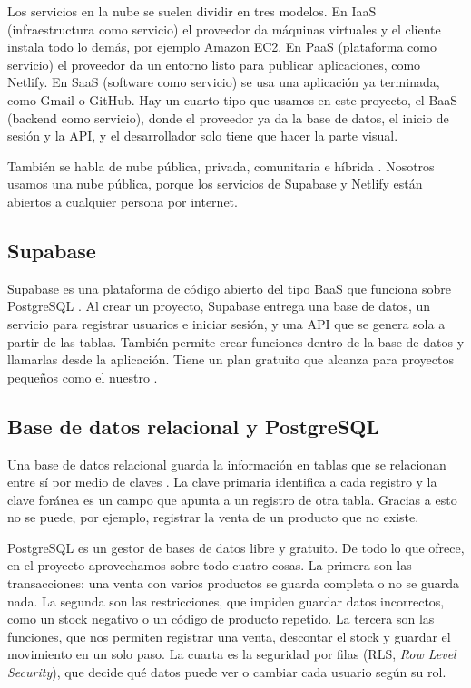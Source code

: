 \documentclass[12pt,a4paper]{article}
\begin{document}
Los servicios en la nube se suelen dividir en tres modelos. En IaaS (infraestructura como servicio) el proveedor da máquinas virtuales y el cliente instala todo lo demás, por ejemplo Amazon EC2. En PaaS (plataforma como servicio) el proveedor da un entorno listo para publicar aplicaciones, como Netlify. En SaaS (software como servicio) se usa una aplicación ya terminada, como Gmail o GitHub. Hay un cuarto tipo que usamos en este proyecto, el BaaS (backend como servicio), donde el proveedor ya da la base de datos, el inicio de sesión y la API, y el desarrollador solo tiene que hacer la parte visual.

También se habla de nube pública, privada, comunitaria e híbrida \cite{nist}. Nosotros usamos una nube pública, porque los servicios de Supabase y Netlify están abiertos a cualquier persona por internet.

\subsection{Supabase}

Supabase es una plataforma de código abierto del tipo BaaS que funciona sobre PostgreSQL \cite{supabasedocs}. Al crear un proyecto, Supabase entrega una base de datos, un servicio para registrar usuarios e iniciar sesión, y una API que se genera sola a partir de las tablas. También permite crear funciones dentro de la base de datos y llamarlas desde la aplicación. Tiene un plan gratuito que alcanza para proyectos pequeños como el nuestro \cite{supabasedocs}.

\subsection{Base de datos relacional y PostgreSQL}

Una base de datos relacional guarda la información en tablas que se relacionan entre sí por medio de claves \cite{silberschatz}. La clave primaria identifica a cada registro y la clave foránea es un campo que apunta a un registro de otra tabla. Gracias a esto no se puede, por ejemplo, registrar la venta de un producto que no existe.

PostgreSQL es un gestor de bases de datos libre y gratuito. De todo lo que ofrece, en el proyecto aprovechamos sobre todo cuatro cosas. La primera son las transacciones: una venta con varios productos se guarda completa o no se guarda nada. La segunda son las restricciones, que impiden guardar datos incorrectos, como un stock negativo o un código de producto repetido. La tercera son las funciones, que nos permiten registrar una venta, descontar el stock y guardar el movimiento en un solo paso. La cuarta es la seguridad por filas (RLS, \textit{Row Level Security}), que decide qué datos puede ver o cambiar cada usuario según su rol.
\end{document}
